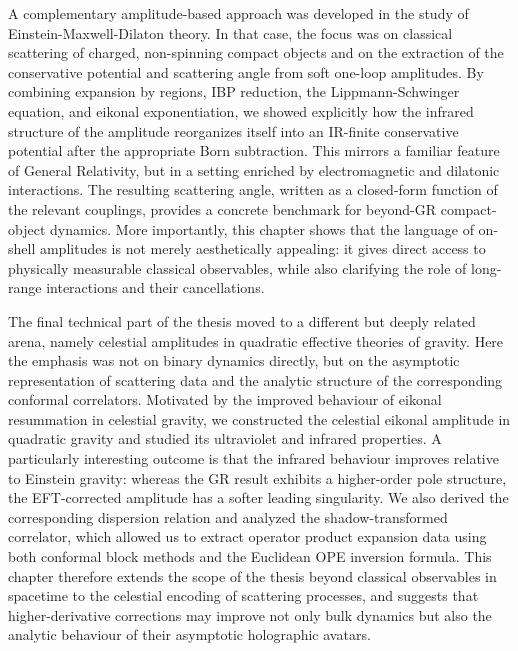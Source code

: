 \documentclass[11pt,a4paper,oneside]{book}
\begin{document}
A complementary amplitude-based approach was developed in the study of Einstein-Maxwell-Dilaton theory. In that case, the focus was on classical scattering of charged, non-spinning compact objects and on the extraction of the conservative potential and scattering angle from soft one-loop amplitudes. By combining expansion by regions, IBP reduction, the Lippmann-Schwinger equation, and eikonal exponentiation, we showed explicitly how the infrared structure of the amplitude reorganizes itself into an IR-finite conservative potential after the appropriate Born subtraction. This mirrors a familiar feature of General Relativity, but in a setting enriched by electromagnetic and dilatonic interactions. The resulting scattering angle, written as a closed-form function of the relevant couplings, provides a concrete benchmark for beyond-GR compact-object dynamics. More importantly, this chapter shows that the language of on-shell amplitudes is not merely aesthetically appealing: it gives direct access to physically measurable classical observables, while also clarifying the role of long-range interactions and their cancellations.

The final technical part of the thesis moved to a different but deeply related arena, namely celestial amplitudes in quadratic effective theories of gravity. Here the emphasis was not on binary dynamics directly, but on the asymptotic representation of scattering data and the analytic structure of the corresponding conformal correlators. Motivated by the improved behaviour of eikonal resummation in celestial gravity, we constructed the celestial eikonal amplitude in quadratic gravity and studied its ultraviolet and infrared properties. A particularly interesting outcome is that the infrared behaviour improves relative to Einstein gravity: whereas the GR result exhibits a higher-order pole structure, the EFT-corrected amplitude has a softer leading singularity. We also derived the corresponding dispersion relation and analyzed the shadow-transformed correlator, which allowed us to extract operator product expansion data using both conformal block methods and the Euclidean OPE inversion formula. This chapter therefore extends the scope of the thesis beyond classical observables in spacetime to the celestial encoding of scattering processes, and suggests that higher-derivative corrections may improve not only bulk dynamics but also the analytic behaviour of their asymptotic holographic avatars.
\end{document}
